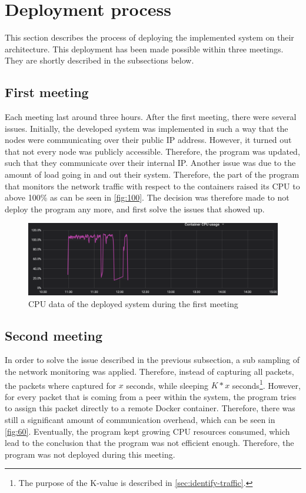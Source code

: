 \section{Deployment process} \label{sec:sb-process}
This section describes the process of deploying the implemented system on their architecture. This deployment has been made possible within three meetings. They are shortly described in the subsections below.

\subsection{First meeting}
Each meeting last around three hours. After the first meeting, there were several issues. Initially, the developed system was implemented in such a way that the nodes were communicating over their public IP address. However, it turned out that not every node was publicly accessible. Therefore, the program was updated, such that they communicate over their internal IP. Another issue was due to the amount of load going in and out their system. Therefore, the part of the program that monitors the network traffic with respect to the containers raised its CPU to above 100\% as can be seen in \autoref{fig:100}.
The decision was therefore made to not deploy the program any more, and first solve the issues that showed up.

\begin{figure}
    \centering
    \includegraphics[width=\textwidth]{gfx/load-100.png}
    \caption{CPU data of the deployed system during the first meeting}
    \label{fig:100}
\end{figure}

\subsection{Second meeting}
In order to solve the issue described in the previous subsection, a sub sampling of the network monitoring was applied. Therefore, instead of capturing all packets, the packets where captured for $x$ seconds, while sleeping $K*x$ seconds\footnote{The purpose of the K-value is described in \autoref{sec:identify-traffic}.}. However, for every packet that is coming from a peer within the system, the program tries to assign this packet directly to a remote Docker container. Therefore, there was still a significant amount of communication overhead, which can be seen in \autoref{fig:60}. Eventually, the program kept growing CPU resources consumed, which lead to the conclusion that the program was not efficient enough. Therefore, the program was not deployed during this meeting.

